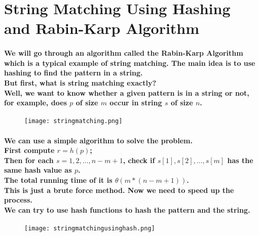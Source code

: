 \section{String Matching Using Hashing and Rabin-Karp Algorithm}

\paragraph{
    We will go through an algorithm called the Rabin-Karp Algorithm which is a typical example of string matching. 
    The main idea is to use hashing to find the pattern in a string.\\
    But first, what is string matching exactly?\\
    Well, we want to know whether a given pattern is in a string or not, for example, does $p$ of size $m$ occur in 
    string $s$ of size $n$.\\
}

\begin{figure}[H]
    \texttt{[image: stringmatching.png]}
\end{figure}

\paragraph{
    We can use a simple algorithm to solve the problem.\\
    First compute $r=h(p)$;\\
    Then for each $s = 1, 2, \ldots, n-m+1$, check if $s[1], s[2], \ldots, s[m]$ has the same hash value as $p$.\\
    The total running time of it is $\theta(m*(n-m+1))$.\\
    This is just a brute force method. Now we need to speed up the process.\\
    We can try to use hash functions to hash the pattern and the string.\\
}

\begin{figure}[H]
    \texttt{[image: stringmatchingusinghash.png]}
\end{figure}

